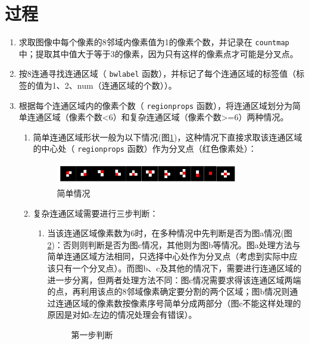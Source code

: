 \documentclass[12pt]{article}
\begin{document}
\section{过程}
\begin{enumerate}
\item 求取图像中每个像素的8邻域内像素值为1的像素个数，并记录在 \verb|countmap| 中；提取其中值大于等于3的像素，因为只有这样的像素点才可能是分叉点。
\item 按8连通寻找连通区域（ \verb|bwlabel| 函数），并标记了每个连通区域的标签值（标签的值为1、2、num（连通区域的个数））。
\item 根据每个连通区域内的像素个数（ \verb|regionprops| 函数），将连通区域划分为简单连通区域（像素个数<6）和复杂连通区域（像素个数>=6）两种情况。
\begin{enumerate}
\item 简单连通区域形状一般为以下情况(图\ref{fig:simple})，这种情况下直接求取该连通区域的中心处（ \verb|regionprops| 函数）作为分叉点（红色像素处）：
\begin{figure}[ht]
\centering
\includegraphics[width=0.8\textwidth]{images/simple}
\caption{简单情况}
\label{fig:simple}
\end{figure}

\item 复杂连通区域需要进行三步判断：
\begin{enumerate}
\item 当该连通区域像素数为6时，在多种情况中先判断是否为图a情况(图\ref{fig:complex1})：否则则判断是否为图c情况，其他则为图b等情况。图a处理方法与简单连通区域方法相同，只选择中心处作为分叉点（考虑到实际中应该只有一个分叉点）。而图b、c及其他的情况下，需要进行连通区域的进一步分离，但两者处理方法不同：图c情况需要求得该连通区域两端的点，再利用该点的8邻域像素确定要分割的两个区域；图b情况则通过连通区域的像素数按像素序号简单分成两部分（图c不能这样处理的原因是对如c左边的情况处理会有错误）。
\begin{figure}[ht]
\centering
{}
\hspace{0.4in}
\hspace{0.4in}
\caption{第一步判断}
\label{fig:complex1}
\end{figure}


\end{enumerate}
\end{enumerate}
\end{enumerate}
\end{document}
